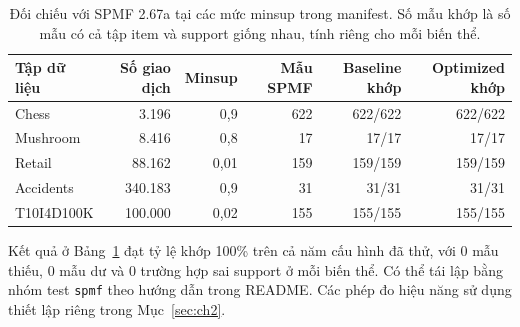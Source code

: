 \begin{table}[!t]
\centering\footnotesize
\caption{Đối chiếu với SPMF 2.67a tại các mức minsup trong manifest. Số mẫu khớp
là số mẫu có cả tập item và support giống nhau, tính riêng cho mỗi biến
thể.}
\label{tab:c1-I}
\setlength{\tabcolsep}{4pt}
\begin{tabular}{lrrrrr}
\hline
\textbf{Tập dữ liệu} & \textbf{Số giao dịch} & \textbf{Minsup} & \textbf{Mẫu SPMF} & \textbf{Baseline khớp} & \textbf{Optimized khớp} \\ \hline
Chess & 3.196 & 0,9 & 622 & 622/622 & 622/622 \\
Mushroom & 8.416 & 0,8 & 17 & 17/17 & 17/17 \\
Retail & 88.162 & 0,01 & 159 & 159/159 & 159/159 \\
Accidents & 340.183 & 0,9 & 31 & 31/31 & 31/31 \\
T10I4D100K & 100.000 & 0,02 & 155 & 155/155 & 155/155 \\
\hline
\end{tabular}
\end{table}

Kết quả ở Bảng~\ref{tab:c1-I} đạt tỷ lệ khớp 100\% trên cả năm cấu hình đã thử, với 0 mẫu thiếu, 0 mẫu dư và 0 trường hợp sai support ở mỗi biến thể. Có thể tái lập bằng nhóm test \texttt{spmf} theo hướng dẫn trong README. Các phép đo hiệu năng sử dụng thiết lập riêng trong Mục~\ref{sec:ch2}.
